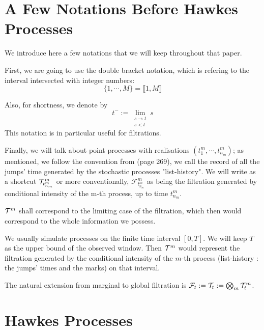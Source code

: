 \documentclass[11pt]{book}
\begin{document}
\section{A Few Notations Before Hawkes Processes}
We introduce here a few notations that we will keep throughout that paper.

First, we are going to use the double bracket notation, which is refering to the interval intersected with integer numbers: 
$$ \{1, \cdots, M\} = \llbracket 1, M \rrbracket $$

Also, for shortness, we denote by $$t^- := \lim_{ \substack{ s \to t \\ s < t}  } s $$ This notation is in particular useful for filtrations.

Finally, we will talk about point processes with realisations $ ( t_{1}^m, \cdots , t_{n_m}^m ) $; as mentioned, we follow the convention from \cite{daley} (page 269), we call the record of all the jumps' time generated by the stochastic processes "list-history".  We will write as a shortcut  $ \mathcal{T}^m_{t_{n_m}^m } $ or more conventionally, $\mathcal F^m_{t_{n_m}^m }$ as being the filtration generated by conditional intensity of the m-th process, up to time $t_{n_m}^m$.

$ \mathcal{T}^m$ shall correspond to the limiting case of the filtration, which then would correspond to the whole information we possess. 

We usually simulate processes on the finite time interval $[0,T]$. We will keep $T$ as the upper bound of the observed window. Then $ \mathcal{T}^m$ would represent the filtration generated by the conditional intensity of the $m$-th process (list-history : the jumps' times and the marks) on that interval.

The natural extension from marginal to global filtration is $\mathcal F_t := \mathcal{T}_t := \bigotimes_m \mathcal{T}^m_t $.

\section{Hawkes Processes}
\end{document}
